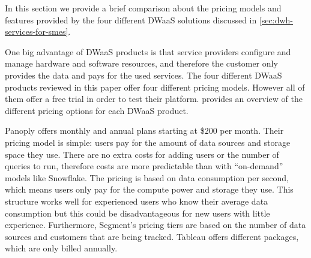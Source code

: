 \documentclass[../paper.tex]{subfiles}
\begin{document}
In this section we provide a brief comparison about the pricing models and
features provided by the four different DWaaS solutions discussed in
\cref{sec:dwh-services-for-smes}.

One big advantage of DWaaS products is that service providers configure and
manage hardware and software resources, and therefore the customer only
provides the data and pays for the used services. The four different DWaaS
products reviewed in this paper offer four different pricing models. However
all of them offer a free trial in order to test their platform.
 provides an overview of the different pricing options
for each DWaaS product.

Panoply offers monthly and annual plans starting at \$200 per month. Their
pricing model is simple: users pay for the amount of data sources and storage
space they use. There are no extra costs for adding users or the number of
queries to run, therefore costs are more predictable than with “on-demand”
models like Snowflake. The pricing is based on data consumption per second,
which means users only pay for the compute power and storage they use. This
structure works well for experienced users who know their average data
consumption but this could be disadvantageous for new users with little
experience. Furthermore, Segment’s pricing tiers are based on the number of
data sources and customers that are being tracked. Tableau offers different
packages, which are only billed annually.
\end{document}
